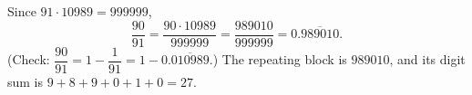 Since $91\cdot10989=999999$,
\[\dfrac{90}{91}=\dfrac{90\cdot10989}{999999}=\dfrac{989010}{999999}=0.\overline{989010}.\]
(Check: $\dfrac{90}{91}=1-\dfrac{1}{91}=1-0.\overline{010989}$.) The repeating block is $989010$, and its digit sum is $9+8+9+0+1+0=\boxed{27}$.
